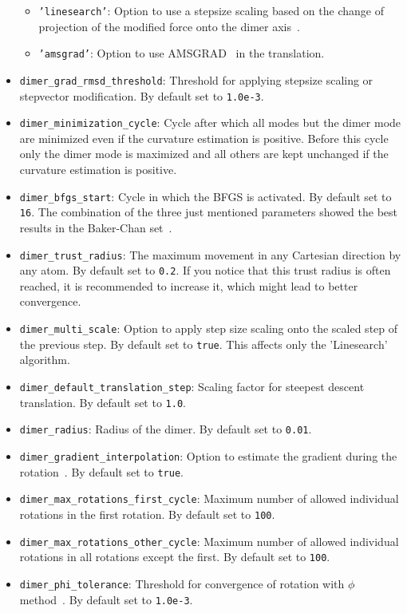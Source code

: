 \documentclass[]{tufte-book}
\begin{document}
\begin{itemize}
\begin{itemize}
\item \texttt{'linesearch'}: Option to use a stepsize scaling based on the change of projection of the modified force onto the dimer axis~\cite{dimer2}.
\item \texttt{'amsgrad'}: Option to use AMSGRAD~\cite{amsgrad} in the translation.
\end{itemize}
\item \texttt{dimer\_grad\_rmsd\_threshold}: Threshold for applying stepsize scaling or stepvector modification. By default set to \texttt{1.0e-3}.
\item \texttt{dimer\_minimization\_cycle}: Cycle after which all modes but the dimer mode are minimized even if the curvature estimation is positive. Before this cycle only the dimer mode is maximized and all others are kept unchanged if the curvature estimation is positive.
\item \texttt{dimer\_bfgs\_start}: Cycle in which the BFGS is activated. By default set to \texttt{16}.
The combination of the three just mentioned parameters showed the best results in the Baker-Chan set~\cite{baker-chan}.
\item \texttt{dimer\_trust\_radius}: The maximum movement in any Cartesian direction by any atom. By default set to \texttt{0.2}. If you notice that this trust radius is often reached, it is recommended to increase it, which might lead to better convergence.
\item \texttt{dimer\_multi\_scale}: Option to apply step size scaling onto the scaled step of the previous step. By default set to \texttt{true}. This affects only the 'Linesearch' algorithm.
\item \texttt{dimer\_default\_translation\_step}: Scaling factor for steepest descent translation. By default set to \texttt{1.0}.
\item \texttt{dimer\_radius}: Radius of the dimer. By default set to \texttt{0.01}.
\item \texttt{dimer\_gradient\_interpolation}: Option to estimate the gradient during the rotation~\cite{dimer2}. By default set to \texttt{true}.
\item \texttt{dimer\_max\_rotations\_first\_cycle}: Maximum number of allowed individual rotations in the first rotation. By default set to \texttt{100}.
\item \texttt{dimer\_max\_rotations\_other\_cycle}: Maximum number of allowed individual rotations in all rotations except the first. By default set to \texttt{100}.
\item \texttt{dimer\_phi\_tolerance}: Threshold for convergence of rotation with $\phi$ method~\cite{dimer2}. By default set to \texttt{1.0e-3}.

\end{itemize}
\end{document}
